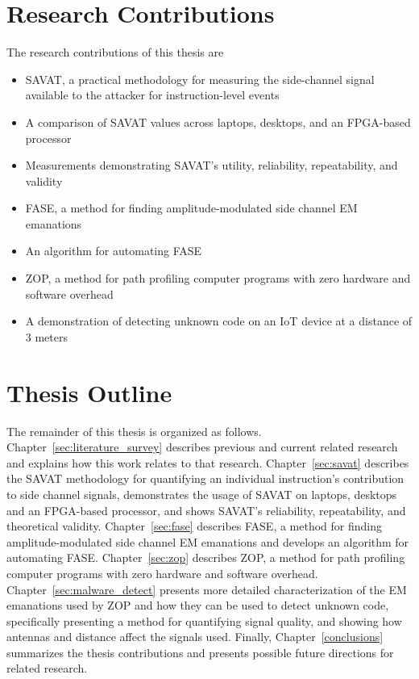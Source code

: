 \section{Research Contributions}
The research contributions of this thesis are
\begin{itemize}
\item SAVAT, a practical methodology for measuring the side-channel signal available to the attacker for instruction-level events~\cite{CALLAN2014}
\item A comparison of SAVAT values across laptops, desktops, and an FPGA-based processor~\cite{Callan2015EMC} 
\item Measurements demonstrating SAVAT's utility, reliability, repeatability, and validity~\cite{Callan2015}
\item FASE, a method for finding amplitude-modulated side channel EM emanations~\cite{FASE_2015}
\item An algorithm for automating FASE~\cite{wang2016}
\item ZOP, a method for path profiling computer programs with zero hardware and software overhead~\cite{zop}
\item A demonstration of detecting unknown code on an IoT device at a distance of 3 meters
\end{itemize}

\section{Thesis Outline}
The remainder of this thesis is organized as follows. Chapter~\ref{sec:literature_survey} describes previous and current related research and explains how this work relates to that research. Chapter~\ref{sec:savat} describes the SAVAT methodology for quantifying an individual instruction's contribution to side channel signals, demonstrates the usage of SAVAT on laptops, desktops and an FPGA-based processor, and shows SAVAT's reliability, repeatability, and theoretical validity. Chapter~\ref{sec:fase} describes FASE, a method for finding amplitude-modulated side channel EM emanations and develops an algorithm for automating FASE.
Chapter~\ref{sec:zop} describes ZOP, a method for path profiling computer programs with zero hardware and software overhead. Chapter~\ref{sec:malware_detect} presents more detailed characterization of the EM emanations used by ZOP and how they can be used to detect unknown code, specifically presenting a method for quantifying signal quality, and showing how antennas and distance affect the signals used. Finally, Chapter~\ref{conclusions} summarizes the thesis contributions and presents possible future directions for related research.
